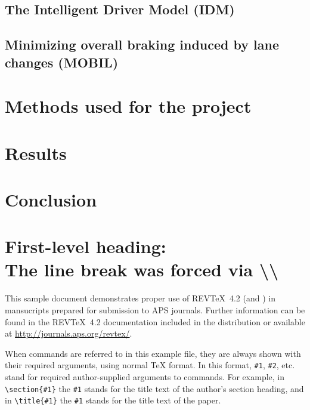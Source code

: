 \documentclass[%
 reprint,
 amsmath,amssymb,
 aps,
]{revtex4-2}
\begin{document}
\subsection{The Intelligent Driver Model (IDM)}
\label{sec:idm}

\subsection{Minimizing overall braking induced by lane changes (MOBIL)}
\label{sec:mobil}


\section{Methods used for the project}
\label{sec:methods}

\section{Results}
\label{sec:results}

\section{Conclusion}
\label{sec:conclusion}


\section{\label{sec:level1}First-level heading:\protect\\ The line
break was forced \lowercase{via} \textbackslash\textbackslash}

This sample document demonstrates proper use of REV\TeX~4.2 (and
\LaTeXe) in mansucripts prepared for submission to APS
journals. Further information can be found in the REV\TeX~4.2
documentation included in the distribution or available at
\url{http://journals.aps.org/revtex/}.

When commands are referred to in this example file, they are always
shown with their required arguments, using normal \TeX{} format. In
this format, \verb+#1+, \verb+#2+, etc. stand for required
author-supplied arguments to commands. For example, in
\verb+\section{#1}+ the \verb+#1+ stands for the title text of the
author's section heading, and in \verb+\title{#1}+ the \verb+#1+
stands for the title text of the paper.
\end{document}
